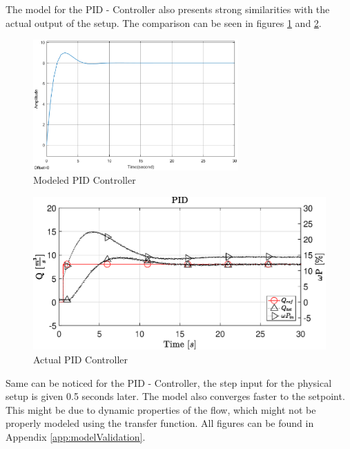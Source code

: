 The model for the PID - Controller also presents strong similarities with the actual output of the setup.
The comparison can be seen in figures \ref{fig:modeledPID2} and \ref{fig:actualPID2}.
\begin{figure}[H]
	\centering
	\includegraphics[width=0.7\textwidth]{figures/06ModelValidation/modelPID.eps}
	\caption{Modeled PID Controller}
	\label{fig:modeledPID2}
\end{figure}
\vspace{-5mm}
\begin{figure}[H]
    \centering
    \includegraphics[width=\textwidth]{figures/07controllerDesign/PIDtest.eps}
    \caption{Actual PID Controller}
	\label{fig:actualPID2}
\end{figure}
Same can be noticed for the PID - Controller, the step input for the physical setup is given 0.5 seconds later.
The model also converges faster to the setpoint. This might be due to dynamic properties of the flow, 
which might not be properly modeled using the transfer function.
All figures can be found in Appendix  \ref{app:modelValidation}.